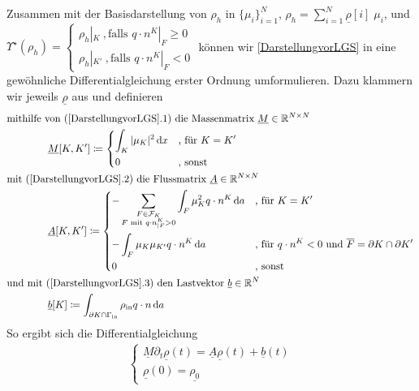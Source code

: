 Zusammen mit der Basisdarstellung von $ \rho_h $ in $\{\mu_i  \}_{i=1}^N$, $ \rho_h = \sum_{i=1}^{N} 
\underline{\rho}[i] \; \mu_i$, und \\
$ \Upsilon^{\star}(\rho_h) = 
\begin{cases} 
\rho_h|_K \ ,\text{falls } q\cdot n^K|_F \geq 0\\
\rho_{h}|_{K'} \ , \text{falls } q\cdot n^K|_F < 0
\end{cases} $ können wir \ref{DarstellungvorLGS} in eine gewöhnliche Differentialgleichung erster Ordnung umformulieren. 
Dazu klammern wir jeweils $ \underline{\rho} $ aus und definieren 
\begin{align*}
&\text{mithilfe von (\ref{DarstellungvorLGS}.1) die Massenmatrix } \underline{M}\in \mathbb{R}^{N \times N} \\  &\qquad \qquad \underline{M}[K,K'] \coloneqq \begin{dcases}
\int_K | \mu_K |^2 \, \mathrm{d} x & \text{, für } K = K' \\
0 &\text{, sonst}
\end{dcases} \\
&\text{mit (\ref{DarstellungvorLGS}.2) die Flussmatrix } \underline{A}\in \mathbb{R}^{N \times N} \\ &\qquad \qquad \underline{A}[K,K'] \coloneqq \begin{dcases}
- \sum_{\substack{F\in \mathcal{F}_K \\ F \text{ mit } q\cdot n^K_{|F} > 0}} \int_F \mu_K^2 q \cdot n^K \, \mathrm{d} a& \text{, für } K = K' \\
- \int_F \mu_K \mu_{K'} q \cdot n^K \, \mathrm{d} a &\text{, für } q \cdot n^K< 0 \text{ und } \overline{F} = \partial K \cap \partial K'\\
0 &\text{, sonst}
\end{dcases} \\
&\text{und mit (\ref{DarstellungvorLGS}.3) den Lastvektor } \underline{b}\in \mathbb{R}^{N} \\ &\qquad \qquad\underline{b}[K] \coloneqq \int_{\partial K \cap \Gamma_{\text{in}}} \rho_{\text{in}} q \cdot n \, \mathrm{d} a
\end{align*}
So ergibt sich die Differentialgleichung
\begin{align*}
\begin{cases}
\underline{M} \partial_t \underline{\rho}(t) = \underline{A} \underline{\rho}(t) + \underline{b}(t) \\
\underline{\rho}(0) = \underline{\rho_0}
\end{cases}\\
\end{align*}
